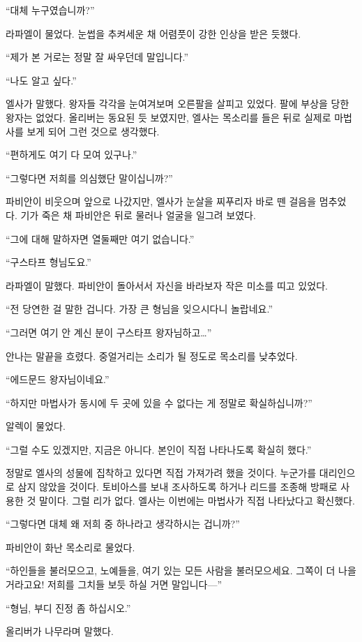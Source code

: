 ``대체 누구였습니까?''

라파엘이 물었다. 눈썹을 추켜세운 채 어렴풋이 강한 인상을 받은 듯했다.

``제가 본 거로는 정말 잘 싸우던데 말입니다.''

``나도 알고 싶다.''

엘사가 말했다. 왕자들 각각을 눈여겨보며 오른팔을 살피고 있었다. 팔에 부상을 당한 왕자는 없었다. 올리버는 동요된 듯 보였지만, 엘사는 목소리를 들은 뒤로 실제로 마법사를 보게 되어 그런 것으로 생각했다.

``편하게도 여기 다 모여 있구나.''

``그렇다면 저희를 의심했단 말이십니까?''

파비안이 비웃으며 앞으로 나갔지만, 엘사가 눈살을 찌푸리자 바로 뗀 걸음을 멈추었다. 기가 죽은 채 파비안은 뒤로 물러나 얼굴을 일그려 보였다.

``그에 대해 말하자면 열둘째만 여기 없습니다.''

``구스타프 형님도요.''

라파엘이 말했다. 파비안이 돌아서서 자신을 바라보자 작은 미소를 띠고 있었다.

``전 당연한 걸 말한 겁니다. 가장 큰 형님을 잊으시다니 놀랍네요.''

``그러면 여기 안 계신 분이 구스타프 왕자님하고\ldots''

안나는 말끝을 흐렸다. 중얼거리는 소리가 될 정도로 목소리를 낮추었다.

``에드문드 왕자님이네요.''

``하지만 마법사가 동시에 두 곳에 있을 수 없다는 게 정말로 확실하십니까?''

알렉이 물었다.

``그럴 수도 있겠지만, 지금은 아니다. 본인이 직접 나타나도록 확실히 했다.''

정말로 엘사의 성물에 집착하고 있다면 직접 가져가려 했을 것이다. 누군가를 대리인으로 삼지 않았을 것이다. 토비아스를 보내 조사하도록 하거나 리드를 조종해 방패로 사용한 것 말이다. 그럴 리가 없다. 엘사는 이번에는 마법사가 직접 나타났다고 확신했다.

``그렇다면 대체 왜 저희 중 하나라고 생각하시는 겁니까?''

파비안이 화난 목소리로 물었다.

``하인들을 불러모으고, 노예들을, 여기 있는 모든 사람을 불러모으세요. 그쪽이 더 나을 거라고요! 저희를 그치들 보듯 하실 거면 말입니다—''

``형님, 부디 진정 좀 하십시오.''

올리버가 나무라며 말했다.

